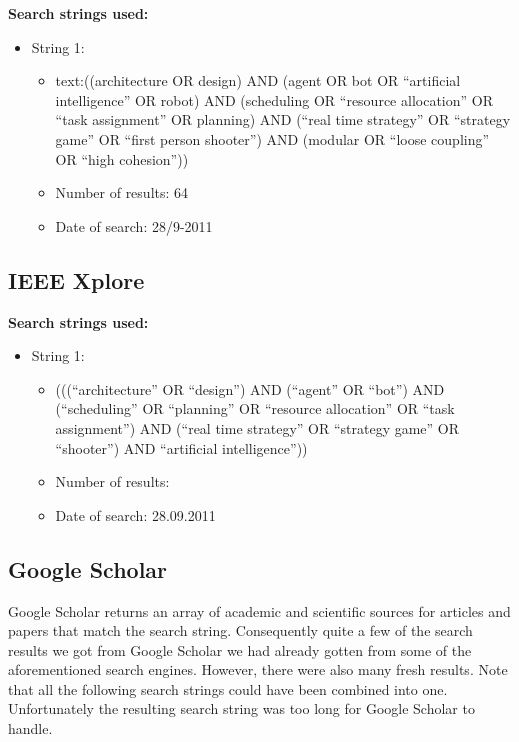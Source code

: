 \textbf{Search strings used:}
\begin{itemize}
\item String 1:
\begin{itemize}
\item text:((architecture OR design) AND (agent OR bot OR ``artificial intelligence'' OR robot) AND (scheduling OR ``resource allocation'' OR ``task assignment'' OR planning) AND (``real time strategy'' OR ``strategy game'' OR ``first person shooter'') AND (modular OR ``loose coupling'' OR ``high cohesion''))
\item Number of results: 64
\item Date of search: 28/9-2011
\end{itemize}
\end{itemize}

\subsection{IEEE Xplore}
\label{sub:ieee_xplore}
\textbf{Search strings used:}
\begin{itemize}
\item String 1:
\begin{itemize}
\item (((``architecture'' OR ``design'') AND (``agent'' OR ``bot'') AND (\newline``scheduling'' OR ``planning'' OR ``resource allocation'' OR \newline``task assignment'') AND (``real time strategy'' OR ``strategy game'' OR ``shooter'') AND ``artificial intelligence''))
\item Number of results: 
\item Date of search: 28.09.2011
\end{itemize}
\end{itemize}

\subsection{Google Scholar}
\label{sub:google_scholar}
Google Scholar returns an array of academic and scientific sources for articles and papers that match the search string. Consequently quite a few of the search results we got from Google Scholar we had already gotten from some of the aforementioned search engines. However, there were also many fresh results. Note that all the following search strings could have been combined into one. Unfortunately the resulting search string was too long for Google Scholar to handle.

